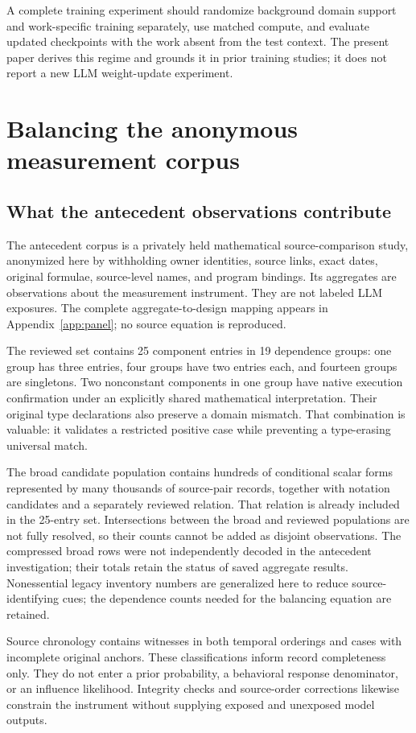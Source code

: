 \documentclass[11pt,letterpaper]{article}
\theoremstyle{definition}\newtheorem{definition}[theorem]{Definition}
\begin{document}
A complete training experiment should randomize background domain support and work-specific training separately, use matched compute, and evaluate updated checkpoints with the work absent from the test context. The present paper derives this regime and grounds it in prior training studies; it does not report a new LLM weight-update experiment.

\section{Balancing the anonymous measurement corpus}
\subsection{What the antecedent observations contribute}
The antecedent corpus is a privately held mathematical source-comparison study, anonymized here by withholding owner identities, source links, exact dates, original formulae, source-level names, and program bindings. Its aggregates are observations about the measurement instrument. They are not labeled LLM exposures. The complete aggregate-to-design mapping appears in Appendix~\ref{app:panel}; no source equation is reproduced.

The reviewed set contains 25 component entries in 19 dependence groups: one group has three entries, four groups have two entries each, and fourteen groups are singletons. Two nonconstant components in one group have native execution confirmation under an explicitly shared mathematical interpretation. Their original type declarations also preserve a domain mismatch. That combination is valuable: it validates a restricted positive case while preventing a type-erasing universal match.

The broad candidate population contains hundreds of conditional scalar forms represented by many thousands of source-pair records, together with notation candidates and a separately reviewed relation. That relation is already included in the 25-entry set. Intersections between the broad and reviewed populations are not fully resolved, so their counts cannot be added as disjoint observations. The compressed broad rows were not independently decoded in the antecedent investigation; their totals retain the status of saved aggregate results. Nonessential legacy inventory numbers are generalized here to reduce source-identifying cues; the dependence counts needed for the balancing equation are retained.

Source chronology contains witnesses in both temporal orderings and cases with incomplete original anchors. These classifications inform record completeness only. They do not enter a prior probability, a behavioral response denominator, or an influence likelihood. Integrity checks and source-order corrections likewise constrain the instrument without supplying exposed and unexposed model outputs.
\end{document}

